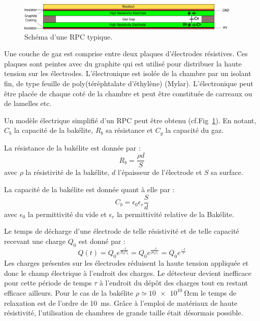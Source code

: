 \begin{figure}[th!]
	\centering
	\includegraphics[width=0.95\textwidth]{RPC/scheme_first.png}
	\captionsetup{type=subfigure}\caption{Schéma d'une RPC typique.}
	\label{RPCscheme}
\end{figure}
\vspace{-0.1cm}
Une couche de gaz est comprise entre deux plaques d'électrodes résistives. Ces plaques sont peintes avec du graphite qui est utilisé pour distribuer la haute tension sur les électrodes. L'électronique est isolée de la chambre par un isolant fin, de type feuille de poly(téréphtalate d'éthylène) (Mylar). L'électronique peut être placée de chaque coté de la chambre et peut être constituée de carreaux ou de lamelles etc.

Un modèle électrique simplifié d'un RPC peut être obtenu (cf.Fig~\ref{RPCscheme}). En notant, $C_{b}$ la capacité de la bakélite, $R_{b}$ sa résistance et $C_{g}$ la capacité du gaz.

La résistance de la bakélite est donnée par :
\begin{equation}
R_b=\frac{\rho d}{S}
\end{equation}
avec $\rho$ la résistivité de la bakélite, $d$ l'épaisseur de l'électrode et $S$ sa surface.

La capacité de la bakélite est donnée quant à elle par :
\begin{equation}
C_{b}=\epsilon_0\epsilon_r\frac{S}{d}
\end{equation} 
avec $\epsilon_0$ la permittivité du vide et $\epsilon_r$ la permittivité relative de la Bakélite.

Le temps de décharge d'une électrode de telle résistivité et de telle capacité recevant une charge $Q_{0}$ est donné par :
\begin{equation}
Q(t)=Q_{0}e^{\frac{-t}{R_bC_b}}=Q_{0}e^{\frac{-t}{\rho\epsilon_{0}\epsilon_{r}}}=Q_{0}e^{\frac{-t}{\tau}}
\end{equation}
Les charges présentes sur les électrodes réduisent la haute tension appliquée et donc le champ électrique à l'endroit des charges. Le détecteur devient inefficace pour cette période de temps $\tau$ à l'endroit du dépôt des charges tout en restant efficace ailleurs. Pour le cas de la bakélite $\rho\simeq\SI{10e10}{\ohm\centi\meter}$ le temps de relaxation est de l'ordre de \SI{10}{\milli\second}. Grâce à l'emploi de matériaux de haute résistivité, l'utilisation de chambres de grande taille était désormais possible.


